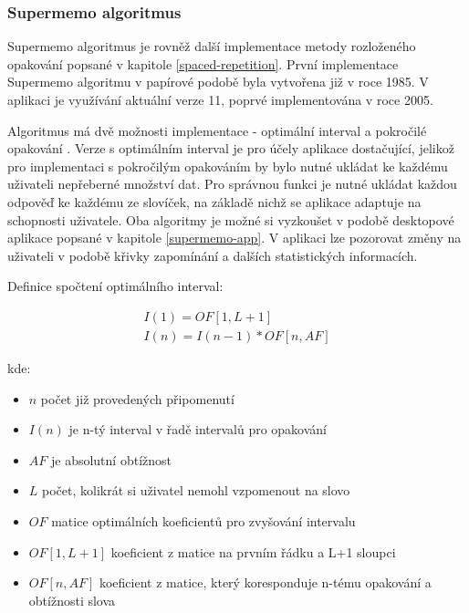 \documentclass[a4paper,11pt,titlepage,fleqn]{article}
\begin{document}
        \subsubsection{Supermemo algoritmus}
            Supermemo algoritmus je rovněž další implementace metody rozloženého opakování popsané v kapitole \ref{spaced-repetition}. První implementace Supermemo algoritmu v papírové podobě byla vytvořena již v roce 1985. V aplikaci je využívání aktuální verze 11, poprvé implementována v roce 2005. 

            Algoritmus má dvě možnosti implementace - optimální interval a pokročilé opakování \cite{bib:supermemo}. Verze s optimálním interval je pro účely aplikace dostačující, jelikož pro implementaci s pokročilým opakováním by bylo nutné ukládat ke každému uživateli nepřeberné množství dat. Pro správnou funkci je nutné ukládat každou odpověď ke každému ze slovíček, na základě nichž se aplikace adaptuje na schopnosti uživatele. Oba algoritmy je možné si vyzkoušet v podobě desktopové aplikace popsané v kapitole \ref{supermemo-app}. V aplikaci lze pozorovat změny na uživateli v podobě křivky zapomínání a dalších statistických informacích. 

            Definice spočtení optimálního interval\cite{bib:supermemo}: 

                \begin{gather}
                    I(1)=OF[1,L+1]\label{eq:2}\\
                    I(n)=I(n-1)*OF[n,AF]
                \end{gather}

            kde:
                \begin{itemize}
                    \item $n$ počet již provedených připomenutí
                    \item $I(n)$ je n-tý interval v řadě intervalů pro opakování
                    \item $AF$ je absolutní obtížnost
                    \item $L$ počet, kolikrát si uživatel nemohl vzpomenout na slovo
                    \item $OF$ matice optimálních koeficientů pro zvyšování intervalu
                    \item $OF[1,L+1]$ koeficient z matice na prvním řádku a L+1 sloupci
                    \item $OF[n,AF]$ koeficient z matice, který koresponduje n-tému opakování a obtížnosti slova
                \end{itemize} 
\end{document}
